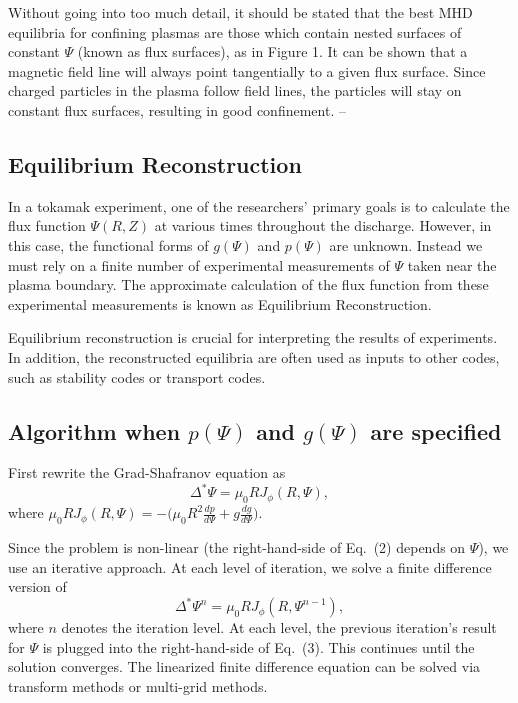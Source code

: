 \documentclass[paper=letter, fontsize=11pt]{scrartcl} %
\begin{document}
Without going into too much detail, it should be stated that the best MHD equilibria for confining plasmas are those which contain nested surfaces of constant $\Psi$ (known as flux surfaces), as in Figure 1.  It can be shown that a magnetic field line will always point tangentially to a given flux surface.  Since charged particles in the plasma follow field lines, the particles will stay on constant flux surfaces, resulting in good confinement.    --



\subsection{Equilibrium Reconstruction}

In a tokamak experiment, one of the researchers' primary goals is to calculate the flux function $\Psi(R,Z)$ at various times throughout the discharge.  However, in this case, the functional forms of $g(\Psi)$ and $p(\Psi)$ are unknown.  Instead we must rely on a finite number of experimental measurements of $\Psi$ taken near the plasma boundary.  The approximate calculation of the flux function from these experimental measurements is known as Equilibrium Reconstruction.  

Equilibrium reconstruction is crucial for interpreting the results of experiments. In addition, the reconstructed equilibria are often used as inputs to other codes, such as stability codes or transport codes.  



\subsection{Algorithm when $p(\Psi)$ and $g(\Psi)$ are specified}



First rewrite the Grad-Shafranov equation as
\begin{equation}
\Delta^{*}\Psi = \mu_0 R J_{\phi} (R, \Psi),
\end{equation}
where $\mu_0 R J_{\phi} (R,\Psi) = - \big(\mu_0 R^2 \frac{d p}{d\Psi} + g \frac{d g}{d\Psi}\big)$.

Since the problem is non-linear (the right-hand-side of Eq.~(2) depends on $\Psi$), we use an iterative approach.  At each level of iteration, we solve a finite difference version of 
\begin{equation}
\Delta^{*}\Psi^{n} = \mu_0 R J_\phi (R, \Psi^{n-1}),
\end{equation}
where $n$ denotes the iteration level. At each level, the previous iteration's result for $\Psi$ is plugged into the right-hand-side of Eq.~(3).  This continues until the solution converges.  The linearized finite difference equation can be solved via transform methods or multi-grid methods.
\end{document}
